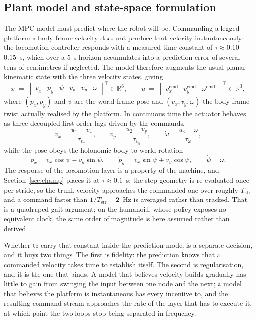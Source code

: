 \documentclass[11pt,a4paper]{article}
\newcommand{\R}{\mathbb{R}}
\newcommand{\Tstr}{T_{\mathrm{str}}}
\begin{document}
\subsection{Plant model and state-space formulation}
\label{sec:model}

The MPC model must predict where the robot will be. Commanding a legged platform
a body-frame velocity does not produce that velocity instantaneously: the locomotion controller responds with
a measured time constant of $\tau\approx0.10$--$0.15$~s, which over a $5$~s horizon accumulates into a
prediction error of several tens of centimetres if neglected. The model therefore augments the usual planar
kinematic state with the three velocity states, giving
\begin{equation}
  x \;=\; \begin{bmatrix} p_x & p_y & \psi & v_x & v_y & \omega\end{bmatrix}^{\!\top}\in\R^{6},
  \qquad
  u \;=\; \begin{bmatrix} v_x^{\mathrm{cmd}} & v_y^{\mathrm{cmd}} & \omega^{\mathrm{cmd}}\end{bmatrix}^{\!\top}\in\R^{3},
  \label{eq:state}
\end{equation}
where $(p_x,p_y)$ and $\psi$ are the world-frame pose and $(v_x,v_y,\omega)$ the body-frame twist actually
realised by the platform. In continuous time the actuator behaves as three decoupled first-order lags driven
by the commands,
\begin{equation}
  \dot v_x = \frac{u_1-v_x}{\tau_{v_x}},\qquad
  \dot v_y = \frac{u_2-v_y}{\tau_{v_y}},\qquad
  \dot \omega = \frac{u_3-\omega}{\tau_\omega},
  \label{eq:lagcont}
\end{equation}
while the pose obeys the holonomic body-to-world rotation
\begin{equation}
  \dot p_x = v_x\cos\psi - v_y\sin\psi,\qquad
  \dot p_y = v_x\sin\psi + v_y\cos\psi,\qquad
  \dot\psi = \omega .
  \label{eq:kincont}
\end{equation}
The response of the locomotion layer is a property of the machine, and Section~\ref{sec:champ} places it
at $\tau\approx0.1$~s: the step geometry is re-evaluated once per stride, so the trunk velocity approaches
the commanded one over roughly $\Tstr$ and a command faster than $1/\Tstr=2$~Hz is averaged rather than
tracked. That is a quadruped-gait argument; on the humanoid, whose policy exposes no equivalent clock, the
same order of magnitude is here assumed rather than derived.

Whether to carry that constant inside the prediction model is a separate decision, and it buys two things.
The first is fidelity: the prediction knows that a commanded velocity takes time to establish itself. The
second is regularisation, and it is the one that binds. A model that believes velocity builds gradually has
little to gain from swinging the input between one node and the next; a model that believes the platform is
instantaneous has every incentive to, and the resulting command stream approaches the rate of the layer that
has to execute it, at which point the two loops stop being separated in frequency.
\end{document}
